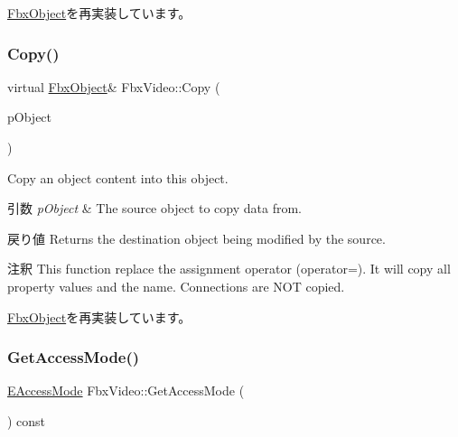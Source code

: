 \hyperlink{class_fbx_object_ad44f814323dc1b5e78bff1bfc608b4bb}{Fbx\+Object}を再実装しています。

\mbox{\label{class_fbx_video_aafd075b5cd4710be1e3f14cd0ede1bce}} 
\subsubsection{\texorpdfstring{Copy()}{Copy()}}
{\footnotesize\ttfamily virtual \hyperlink{class_fbx_object}{Fbx\+Object}\& Fbx\+Video\+::\+Copy (\begin{DoxyParamCaption}\item[{const \hyperlink{class_fbx_object}{Fbx\+Object} \&}]{p\+Object }\end{DoxyParamCaption})\hspace{0.3cm}{\ttfamily [virtual]}}

Copy an object content into this object. 
\begin{DoxyParams}{引数}
{\em p\+Object} & The source object to copy data from. \\
\hline
\end{DoxyParams}
\begin{DoxyReturn}{戻り値}
Returns the destination object being modified by the source. 
\end{DoxyReturn}
\begin{DoxyRemark}{注釈}
This function replace the assignment operator (operator=). It will copy all property values and the name. Connections are N\+OT copied. 
\end{DoxyRemark}


\hyperlink{class_fbx_object_a0c0c5adb38284d14bb82c04d54504a3e}{Fbx\+Object}を再実装しています。

\mbox{\label{class_fbx_video_af03167bd6b840efe8425017fb7a606e3}} 
\subsubsection{\texorpdfstring{Get\+Access\+Mode()}{GetAccessMode()}}
{\footnotesize\ttfamily \hyperlink{class_fbx_video_a6dd88dabb2170adcd8c58952ed2e0c40}{E\+Access\+Mode} Fbx\+Video\+::\+Get\+Access\+Mode (\begin{DoxyParamCaption}{ }\end{DoxyParamCaption}) const}

